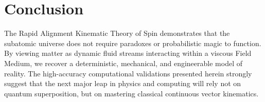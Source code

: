 \documentclass[reprint,amsmath,amssymb,aps,prd,twocolumn]{revtex4-2}
\begin{document}
\section{Conclusion}
The Rapid Alignment Kinematic Theory of Spin demonstrates that the subatomic universe does not require paradoxes or probabilistic magic to function. By viewing matter as dynamic fluid streams interacting within a viscous Field Medium, we recover a deterministic, mechanical, and engineerable model of reality. The high-accuracy computational validations presented herein strongly suggest that the next major leap in physics and computing will rely not on quantum superposition, but on mastering classical continuous vector kinematics.
\end{document}
